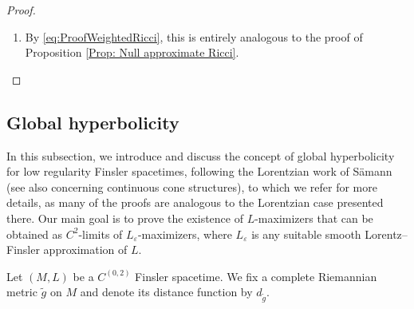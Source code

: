 \documentclass[a4paper,11pt]{article}
\numberwithin{equation}{section}
\theoremstyle{definition}
\theoremstyle{plain}
\newcommand{\eps}{\varepsilon}
\newcommand{\Ric}{\mathrm{Ric}}
\newcommand{\m}{\mathfrak m}
\begin{document}
\begin{proof}
\begin{enumerate}
To finally get \eqref{eq:ProofWeightedRicci}, we use \eqref{eq:WeightedRicciSimplified} to see $\Ric_{\m_\eps}^N[\widecheck{L}_\eps] -\Ric_{\m_\eps}^N[L_\eps] \to 0$.
The Hessian terms cancel (since $u_\eps$ is common), while $\partial_{x^i}(\widecheck G_\varepsilon^i-G_\varepsilon^i)$
tends to $0$ locally uniformly by \eqref{eq:GNN}.
The difference of the terms $N^i_kN^k_i$ tends to $0$ locally uniformly by \eqref{eq:EstimatesCheckSpray} and the local uniform boundedness of the connection coefficients.
It therefore suffices to argue that both
\begin{equation*}
    (\widecheck G_\eps^i - G_\eps^i) \frac{\partial u_\eps}{\partial x^i}  \quad \textnormal{and} \quad \left((\widecheck N_\eps)^i_i - v^j\frac{\partial u_\eps}{\partial x^j}\right)^2- \left((N_\eps)^i_i -v^j\frac{\partial u_\eps}{\partial x^j}\right)^2
\end{equation*}
converge to $0$ locally uniformly, where the last term is omitted in the case $N = \infty$. 
This, in turn, follows easily from the local uniform boundedness of $\partial_{x^i} u_\eps$ and \eqref{eq:EstimatesCheckSpray}. 
From \eqref{eq:ProofWeightedRicci}, we simply repeat the argument given in the proof of Corollary \ref{cor:GeneralRicciBound} to get \eqref{eq:WeightedGeneralRicciApprox}.

\item By \eqref{eq:ProofWeightedRicci}, this is entirely analogous to the proof of Proposition \ref{Prop: Null approximate Ricci}. \qedhere
\end{enumerate}
\end{proof}

\subsection{Global hyperbolicity}

In this subsection, we introduce and discuss the concept of global hyperbolicity for low regularity Finsler spacetimes, following the Lorentzian work of S\"amann \cite{Saemann} (see also \cite{FathiSiconolfi} concerning continuous cone structures), to which we refer for more details, as many of the proofs are analogous to the Lorentzian case presented there. 
Our main goal is to prove the existence of $L$-maximizers that can be obtained as $C^2$-limits of $L_\varepsilon$-maximizers, where $L_\varepsilon$ is any suitable smooth Lorentz--Finsler approximation of $L$.

Let $(M,L)$ be a $C^{(0,2)}$ Finsler spacetime. 
We fix a complete Riemannian metric $\tilde g$ on $M$ and denote its distance function by $d_{\tilde g}$. 
\end{document}
